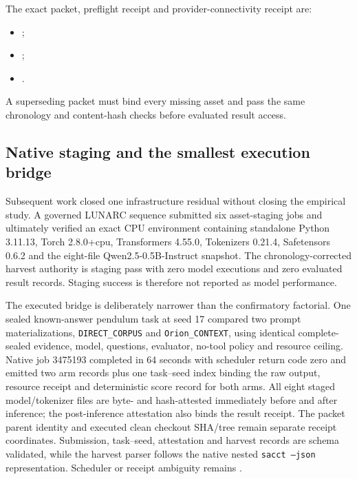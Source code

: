 The exact packet, preflight receipt and provider-connectivity receipt are:
\begin{itemize}[leftmargin=2em]
\item {};

\item {};

\item {}.
\end{itemize}
A superseding packet must bind every missing asset and pass the same chronology and content-hash checks before evaluated result access.

\subsection{Native staging and the smallest execution bridge}

Subsequent work closed one infrastructure residual without closing the empirical
study.  A governed LUNARC sequence submitted six asset-staging jobs and ultimately
verified an exact CPU environment containing standalone Python 3.11.13, Torch
2.8.0+cpu, Transformers 4.55.0, Tokenizers 0.21.4, Safetensors 0.6.2 and the
eight-file Qwen2.5-0.5B-Instruct snapshot.  The chronology-corrected harvest
authority is staging pass with zero model executions and zero evaluated result
records.  Staging success is therefore not reported as model performance.

The executed bridge is deliberately narrower than the confirmatory factorial.
One sealed known-answer pendulum task at seed 17 compared two
prompt materializations, \texttt{DIRECT\_CORPUS} and
\texttt{Orion\_CONTEXT}, using identical complete-sealed evidence, model,
questions, evaluator, no-tool policy and resource ceiling.  Native job 3475193
completed in 64 seconds with scheduler return code zero and emitted two arm
records plus one task--seed index binding the raw output,
resource receipt and deterministic score record for both arms.  All eight staged
model/tokenizer files are byte- and hash-attested immediately before and after
inference; the post-inference attestation also binds the result receipt.  The
packet parent identity and executed clean checkout SHA/tree remain separate
receipt coordinates.  Submission, task--seed, attestation and harvest records
are schema validated, while the harvest parser follows the native nested
\texttt{sacct --json} representation.  Scheduler or receipt ambiguity remains
\CannotCheck{}.

